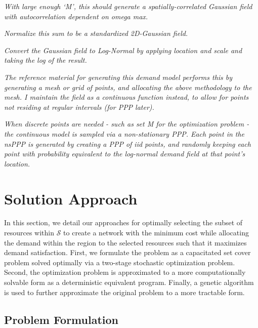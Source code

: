 \documentclass[12pt,onecolumn]{IEEEtran}
\begin{document}
\textit{With large enough `M', this should generate a spatially-correlated Gaussian field with autocorrelation dependent on omega max.}
		
\textit{Normalize this sum to be a standardized 2D-Gaussian field.}
		
\textit{Convert the Gaussian field to Log-Normal by applying location and scale and taking the log of the result.}
		
\textit{The reference material for generating this demand model performs this by generating a mesh or grid of points, and allocating the above methodology to the mesh.  I maintain the field as a continuous function instead, to allow for points not residing at regular intervals (for PPP later).}

\textit{When discrete points are needed - such as set M for the optimization problem - the continuous model is sampled via a non-stationary PPP.  Each point in the nsPPP is generated by creating a PPP of iid points, and randomly keeping each point with probability equivalent to the log-normal demand field at that point's location.}
\fi

\section{Solution Approach}

In this section, we detail our approaches for optimally selecting the subset of resources within $\mathcal{S}$ to create a network with the minimum cost while allocating the demand within the region to the selected resources such that it maximizes demand satisfaction.  First, we formulate the problem as a capacitated set cover problem solved optimally via a two-stage stochastic optimization problem.  Second, the optimization problem is approximated to a more computationally solvable form as a deterministic equivalent program.  Finally, a genetic algorithm is used to further approximate the original problem to a more tractable form.


\subsection{Problem Formulation}
\end{document}

